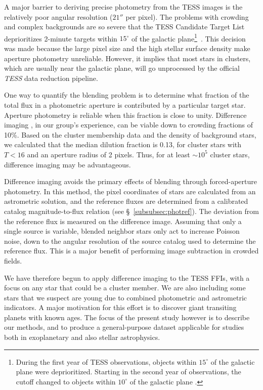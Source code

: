 \documentclass[12pt,twocolumn,tighten]{aastex62}
\begin{document}
A major barrier to deriving precise photometry from the TESS images is
the relatively poor angular resolution ($21''$ per pixel).   The
problems with crowding and complex backgrounds are so severe that the
TESS Candidate Target List deprioritizes 2-minute targets within
$15^\circ$ of the galactic plane\footnote{During the first year of
TESS observations, objects within $15^\circ$ of the galactic plane
were deprioritized. Starting in the second year of observations, the
cutoff changed to objects within $10^\circ$ of the galactic plane
\citep{stassun_TIC8_2019}.}~\citep{stassun_TIC_2018,stassun_TIC8_2019}.
This decision was made because the large pixel size and the high
stellar surface density make aperture photometry unreliable.  However,
it implies that most stars in clusters, which are usually near
the galactic plane, will go unprocessed by the official {\it TESS}
data reduction pipeline.

One way to quantify the blending problem is to determine what fraction
of the total flux in a photometric aperture is contributed by a
particular target star. Aperture photometry is reliable when this
fraction is close to unity.  Difference imaging
\citep{Alard_Lupton_1998,miller_optimal_2008}, in our group's
experience, can be viable down to crowding fractions of 10\%.  Based
on the \citet{Kharchenko_et_al_2013} cluster membership data and the
density of background stars, we calculated that the median dilution
fraction is 0.13, for cluster stars with $T< 16$ and an aperture
radius of 2 pixels.  Thus, for at least $\sim$$10^5$ cluster stars,
difference imaging may be advantageous.

Difference imaging avoids the primary effects of blending through
forced-aperture photometry.  In this method, the pixel coordinates of
stars are calculated from an astrometric solution, and the reference
fluxes are determined from a calibrated catalog magnitude-to-flux
relation (see \S~\ref{subsubsec:photref}).  The deviation from the
reference flux is measured on the difference image.  Assuming that
only a single source is variable, blended neighbor stars only act to
increase Poisson noise, down to the angular resolution of the source
catalog used to determine the reference flux.  This is a major benefit
of performing image subtraction in crowded fields.

We have therefore begun to apply difference imaging to the TESS
FFIs, with a focus on any star that could be a cluster member.
We are also including some stars that we suspect are young due to
combined photometric and astrometric indicators.  A major motivation
for this effort is to discover giant transiting planets with known
ages.  The focus of the present study however is to describe our
methods, and to produce a general-purpose dataset applicable for
studies both in exoplanetary and also stellar astrophysics.
\end{document}
